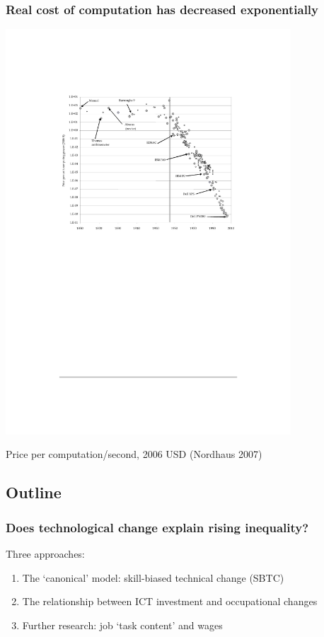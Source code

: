 \documentclass[red]{beamer}
\begin{document}
\begin{frame}[c]
\frametitle{Real cost of computation has decreased exponentially}
\begin{center}
  \includegraphics[width=0.8\textwidth]{slides_fig/nordhaus_2007.pdf}
\end{center}
Price per computation/second, 2006 USD (Nordhaus 2007)
\end{frame}

\subsection{Outline}
\begin{frame}[c]
\frametitle{Does technological change explain rising inequality?}
Three approaches:
\begin{enumerate}
\vfill\item The `canonical' model: skill-biased technical change (SBTC)
\vfill\item The relationship between ICT investment and occupational changes
\vfill\item Further research: job `task content' and wages
\end{enumerate}
\end{frame}
\end{document}
